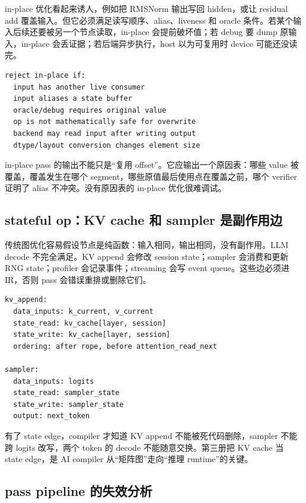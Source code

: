 in-place 优化看起来诱人，例如把 RMSNorm 输出写回 hidden，或让 residual add 覆盖输入。但它必须满足读写顺序、alias、liveness 和 oracle 条件。若某个输入后续还要被另一个节点读取，in-place 会提前破坏值；若 debug 要 dump 原输入，in-place 会丢证据；若后端异步执行，host 以为可复用时 device 可能还没读完。

\begin{lstlisting}[numbers=none,caption={in-place 改写的拒绝条件}]
reject in-place if:
  input has another live consumer
  input aliases a state buffer
  oracle/debug requires original value
  op is not mathematically safe for overwrite
  backend may read input after writing output
  dtype/layout conversion changes element size
\end{lstlisting}

in-place pass 的输出不能只是“复用 offset”。它应输出一个原因表：哪些 value 被覆盖，覆盖发生在哪个 segment，哪些原值最后使用点在覆盖之前，哪个 verifier 证明了 alias 不冲突。没有原因表的 in-place 优化很难调试。

\subsection{stateful op：KV cache 和 sampler 是副作用边}

传统图优化容易假设节点是纯函数：输入相同，输出相同，没有副作用。LLM decode 不完全满足。KV append 会修改 session state；sampler 会消费和更新 RNG state；profiler 会记录事件；streaming 会写 event queue。这些边必须进 IR，否则 pass 会错误重排或删除它们。

\begin{lstlisting}[numbers=none,caption={stateful op 的 IR 边}]
kv_append:
  data_inputs: k_current, v_current
  state_read: kv_cache[layer, session]
  state_write: kv_cache[layer, session]
  ordering: after rope, before attention_read_next

sampler:
  data_inputs: logits
  state_read: sampler_state
  state_write: sampler_state
  output: next_token
\end{lstlisting}

有了 state edge，compiler 才知道 KV append 不能被死代码删除，sampler 不能跨 logits 改写，两个 token 的 decode 不能随意交换。第三册把 KV cache 当 state edge，是 AI compiler 从“矩阵图”走向“推理 runtime”的关键。

\subsection{pass pipeline 的失效分析}

